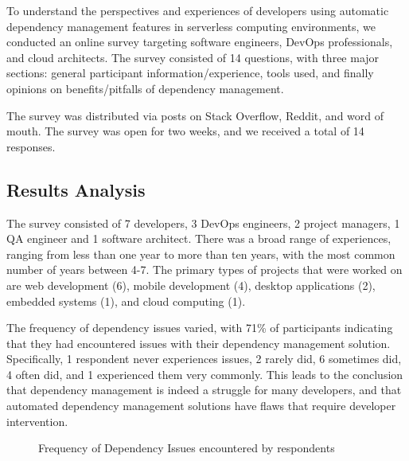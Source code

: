 \documentclass[sigconf]{acmart}
\begin{document}
To understand the perspectives and experiences of developers using automatic dependency management features in serverless computing environments, we conducted an online survey targeting software engineers, DevOps professionals, and cloud architects. The survey consisted of 14 questions, with three major sections: general participant information/experience, tools used, and finally opinions on benefits/pitfalls of dependency management.

The survey was distributed via posts on Stack Overflow, Reddit, and word of mouth. The survey was open for two weeks, and we received a total of 14 responses.

\subsection{Results Analysis}

The survey consisted of 7 developers, 3 DevOps engineers, 2 project managers, 1 QA engineer and 1 software architect. There was a broad range of experiences, ranging from less than one year to more than ten years, with the most common number of years between 4-7. The primary types of projects that were worked on are web development (6), mobile development (4), desktop applications (2), embedded systems (1), and cloud computing (1).

The frequency of dependency issues varied, with 71\% of participants indicating that they had encountered issues with their dependency management solution. Specifically, 1 respondent never experiences issues, 2 rarely did, 6 sometimes did, 4 often did, and 1 experienced them very commonly. This leads to the conclusion that dependency management is indeed a struggle for many developers, and that automated dependency management solutions have flaws that require developer intervention.

\begin{figure}[h]
	\centering
	\caption{Frequency of Dependency Issues encountered by respondents}
	\label{fig:frequency}
\end{figure}
\end{document}
